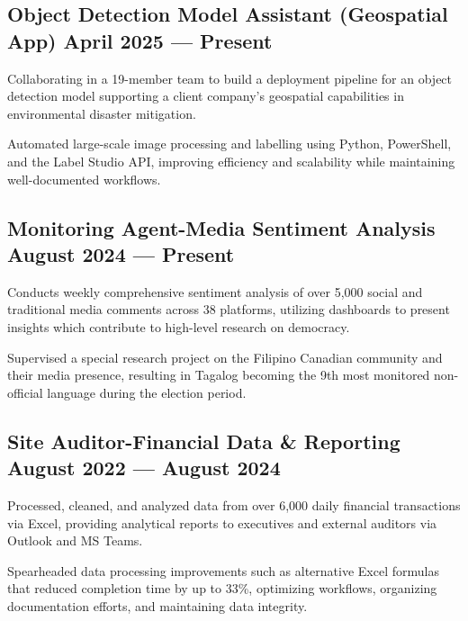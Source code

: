 \subsection{{Object Detection Model Assistant (Geospatial App) \hfill April 2025 --- Present}}
\begin{zitemize}
\item Collaborating in a 19-member team to build a deployment pipeline for an object detection model supporting a
client company’s geospatial capabilities in environmental disaster mitigation.
\item Automated large-scale image processing and labelling using Python, PowerShell, and the Label Studio API,
improving efficiency and scalability while maintaining well-documented workflows.
\end{zitemize}

\subsection{{Monitoring Agent-Media Sentiment Analysis \hfill August 2024 --- Present}}
\begin{zitemize}
\item Conducts weekly comprehensive sentiment analysis of over 5,000 social and traditional media comments across
38 platforms, utilizing dashboards to present insights which contribute to high-level research on democracy.
\item Supervised a special research project on the Filipino Canadian community and their media presence, resulting
in Tagalog becoming the 9th most monitored non-official language during the election period.
\end{zitemize}

\subsection{{Site Auditor-Financial Data \& Reporting \hfill August 2022 --- August 2024}}
\begin{zitemize}
\item Processed, cleaned, and analyzed data from over 6,000 daily financial transactions via Excel, providing analytical
reports to executives and external auditors via Outlook and MS Teams.
\item Spearheaded data processing improvements such as alternative Excel formulas that reduced completion time by
up to 33\%, optimizing workflows, organizing documentation efforts, and maintaining data integrity.
\end{zitemize}

